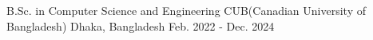 

\begin{cventries}

  \cventry
    {B.Sc. in Computer Science and Engineering} %
    {CUB(Canadian University of Bangladesh)} %
    {Dhaka, Bangladesh} %
    {Feb. 2022 - Dec. 2024} %
    {}%

\end{cventries}
